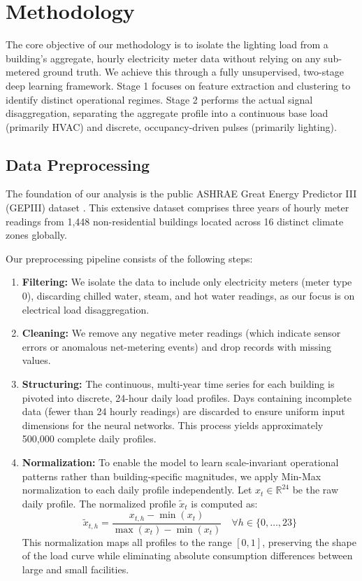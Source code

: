 \section{Methodology}

The core objective of our methodology is to isolate the lighting load from a building's aggregate, hourly electricity meter data without relying on any sub-metered ground truth. We achieve this through a fully unsupervised, two-stage deep learning framework. Stage 1 focuses on feature extraction and clustering to identify distinct operational regimes. Stage 2 performs the actual signal disaggregation, separating the aggregate profile into a continuous base load (primarily HVAC) and discrete, occupancy-driven pulses (primarily lighting).

\subsection{Data Preprocessing}
The foundation of our analysis is the public ASHRAE Great Energy Predictor III (GEPIII) dataset \cite{ashrae_2020}. This extensive dataset comprises three years of hourly meter readings from 1,448 non-residential buildings located across 16 distinct climate zones globally.

Our preprocessing pipeline consists of the following steps:
\begin{enumerate}
    \item \textbf{Filtering:} We isolate the data to include only electricity meters (meter type 0), discarding chilled water, steam, and hot water readings, as our focus is on electrical load disaggregation.
    \item \textbf{Cleaning:} We remove any negative meter readings (which indicate sensor errors or anomalous net-metering events) and drop records with missing values.
    \item \textbf{Structuring:} The continuous, multi-year time series for each building is pivoted into discrete, 24-hour daily load profiles. Days containing incomplete data (fewer than 24 hourly readings) are discarded to ensure uniform input dimensions for the neural networks. This process yields approximately 500,000 complete daily profiles.
    \item \textbf{Normalization:} To enable the model to learn scale-invariant operational patterns rather than building-specific magnitudes, we apply Min-Max normalization to each daily profile independently. Let $x_t \in \mathbb{R}^{24}$ be the raw daily profile. The normalized profile $\tilde{x}_t$ is computed as:
    \begin{equation}
        \tilde{x}_{t, h} = \frac{x_{t, h} - \min(x_t)}{\max(x_t) - \min(x_t)} \quad \forall h \in \{0, \dots, 23\}
    \end{equation}
    This normalization maps all profiles to the range $[0, 1]$, preserving the shape of the load curve while eliminating absolute consumption differences between large and small facilities.
\end{enumerate}


